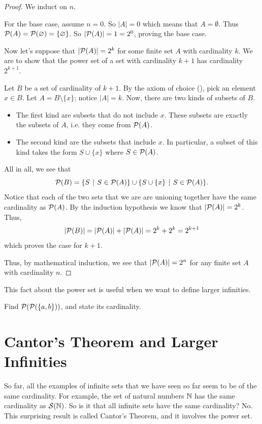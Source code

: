 \begin{proof}
    We induct on $n$.

    For the base case, assume $n = 0$. So $|A| = 0$ which means that $A = \emptyset$. Thus ${\mathcal{P}(A)} = {\mathcal{P}(\varnothing)} = \{\varnothing\}$. So $|{\mathcal{P}(A)}| = 1 = 2^0$, proving the base case.

    Now let's suppose that $|{\mathcal{P}(A)}| = 2^k$ for some finite set $A$ with cardinality $k$. We are to show that the power set of a set with cardinality $k+1$ has cardinality $2^{k+1}$.

    Let $B$ be a set of cardinality of $k+1$. By the axiom of choice (), pick an element $x \in B$. Let $A = B \setminus \{x\}$; notice $|A| = k$. Now, there are two kinds of subsets of $B$.
    \begin{itemize}
        \item The first kind are subsets that do not include $x$. These subsets are exactly the subsets of $A$, i.e. they come from ${\mathcal{P}(A)}$.
        \item The second kind are the subsets that include $x$. In particular, a subset of this kind takes the form $S \cup \{x\}$ where $S \in {\mathcal{P}(A)}$.
    \end{itemize}
    All in all, we see that
    \[
        \Power{B} = \{S \vert S \in \Power{A}\} \cup \{S \cup \{x\} \vert S \in \Power{A}\}.
    \]
    Notice that each of the two sets that we are are unioning together have the same cardinality as ${\mathcal{P}(A)}$. By the induction hypothesis we know that $|{\mathcal{P}(A)}| = 2^k$. Thus,
    \[
        |{\mathcal{P}(B)}| = |{\mathcal{P}(A)}| + |{\mathcal{P}(A)}| = 2^k + 2^k = 2^{k+1}
    \]
    which proves the case for $k+1$.

    Thus, by mathematical induction, we see that $|{\mathcal{P}(A)}| = 2^n$ for any finite set $A$ with cardinality $n$.
\end{proof}

This fact about the power set is useful when we want to define larger infinities.

\begin{exercise}
    Find ${\mathcal{P}({\mathcal{P}(\{a, b\})})}$, and state its cardinality.
\end{exercise}

\section{Cantor's Theorem and Larger Infinities}
So far, all the examples of infinite sets that we have seen so far seem to be of the same cardinality. For example, the set of natural numbers $\mathbb{N}$ has the same cardinality as ${\mathcal{S}(\mathbb{N})}$. So is it that all infinite sets have the same cardinality? No. This surprising result is called Cantor's Theorem, and it involves the power set.

